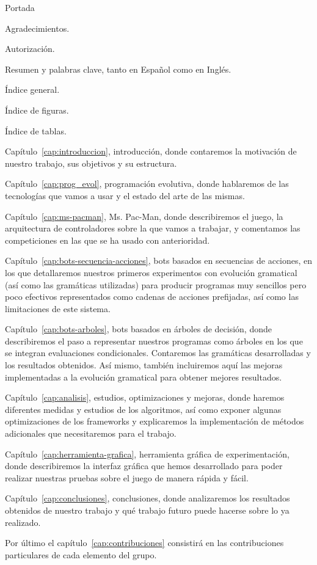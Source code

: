 Portada

Agradecimientos.

Autorización.

Resumen y palabras clave, tanto en Español como en Inglés.

Índice general.

Índice de figuras.

Índice de tablas.

Capítulo~\ref{cap:introduccion}, introducción, donde contaremos la motivación de nuestro trabajo, sus objetivos y su estructura.

Capítulo~\ref{cap:prog_evol}, programación evolutiva, donde hablaremos de las tecnologías que vamos a usar y el estado del arte de las mismas.

Capítulo~\ref{cap:ms-pacman}, Ms. Pac-Man, donde describiremos el juego, la arquitectura de controladores sobre la que vamos a trabajar, y comentamos las competiciones en las que se ha usado con anterioridad.

Capítulo~\ref{cap:bots-secuencia-acciones}, bots basados en secuencias de acciones, en los que detallaremos nuestros primeros experimentos con evolución gramatical (así como las gramáticas utilizadas) para producir programas muy sencillos pero poco efectivos representados como cadenas de acciones prefijadas, así como las limitaciones de este sistema.

Capítulo~\ref{cap:bots-arboles}, bots basados en árboles de decisión, donde describiremos el paso a representar nuestros programas como árboles en los que se integran evaluaciones condicionales. Contaremos las gramáticas desarrolladas y los resultados obtenidos. Así mismo, también incluiremos aquí las mejoras implementadas a la evolución gramatical para obtener mejores resultados.

Capítulo~\ref{cap:analisis}, estudios, optimizaciones y mejoras, donde haremos diferentes medidas y estudios de los algoritmos, así como exponer algunas optimizaciones de los frameworks y explicaremos la implementación de métodos adicionales que necesitaremos para el trabajo.

Capítulo~\ref{cap:herramienta-grafica}, herramienta gráfica de experimentación, donde describiremos la interfaz gráfica que hemos desarrollado para poder realizar nuestras pruebas sobre el juego de manera rápida y fácil.

Capítulo~\ref{cap:conclusiones}, conclusiones, donde analizaremos los resultados obtenidos de nuestro trabajo y qué trabajo futuro puede hacerse sobre lo ya realizado.

Por último el capítulo~\ref{cap:contribuciones} consistirá en las contribuciones particulares de cada elemento del grupo.
